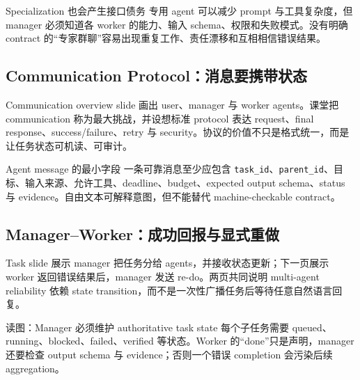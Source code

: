 \begin{warningbox}{Specialization 也会产生接口债务}
专用 agent 可以减少 prompt 与工具复杂度，但 manager 必须知道各 worker 的能力、输入 schema、权限和失败模式。没有明确 contract 的“专家群聊”容易出现重复工作、责任漂移和互相相信错误结果。
\end{warningbox}

\subsection{Communication Protocol：消息要携带状态}

Communication overview slide 画出 user、manager 与 worker agents。课堂把 communication 称为最大挑战，并设想标准 protocol 表达 request、final response、success/failure、retry 与 security。协议的价值不只是格式统一，而是让任务状态可机读、可审计。


\begin{knowledgebox}{Agent message 的最小字段}
一条可靠消息至少应包含 \texttt{task\_id}、\texttt{parent\_id}、目标、输入来源、允许工具、deadline、budget、expected output schema、status 与 evidence。自由文本可解释意图，但不能替代 machine-checkable contract。
\end{knowledgebox}


\subsection{Manager--Worker：成功回报与显式重做}

Task slide 展示 manager 把任务分给 agents，并接收状态更新；下一页展示 worker 返回错误结果后，manager 发送 re-do。两页共同说明 multi-agent reliability 依赖 state transition，而不是一次性广播任务后等待任意自然语言回复。


\begin{knowledgebox}{读图：Manager 必须维护 authoritative task state}
每个子任务需要 queued、running、blocked、failed、verified 等状态。Worker 的“done”只是声明，manager 还要检查 output schema 与 evidence；否则一个错误 completion 会污染后续 aggregation。
\end{knowledgebox}

